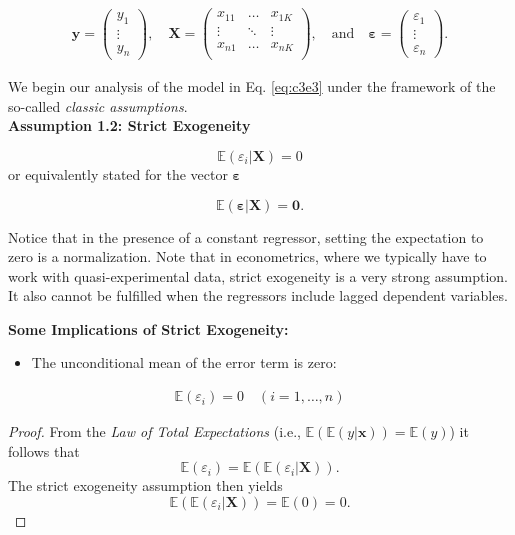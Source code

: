 \documentclass[]{book}
\providecommand{\tightlist}{%
  \setlength{\itemsep}{0pt}\setlength{\parskip}{0pt}}
\theoremstyle{definition}
\theoremstyle{definition}
\theoremstyle{definition}
\theoremstyle{remark}
\let\BeginKnitrBlock\begin \let\EndKnitrBlock\end
\begin{document}
\[
\begin{align*}
\mathbf{y} = \left(\begin{matrix}y_1\\ \vdots\\y_n\end{matrix}\right),\quad
\mathbf{X} = \left( \begin{matrix}
x_{11} & \dots & x_{1K} \\ \vdots & \ddots & \vdots \\ x_{n1} &\dots&x_{nK}\\
\end{matrix}\right),\quad\text{and}\quad \boldsymbol{\varepsilon}=\left(\begin{matrix}\varepsilon_1\\ \vdots\\ \varepsilon_n\end{matrix}\right).
\end{align*}
\]

We begin our analysis of the model in Eq. \eqref{eq:c3e3} under the
framework of the so-called \emph{classic assumptions}.\\
\textbf{Assumption 1.2: Strict Exogeneity}

\[\mathbb{E}(\varepsilon_i|\mathbf{X}) = 0\]
or equivalently stated for the vector \(\boldsymbol{\varepsilon}\)

\[\mathbb{E}(\boldsymbol{\varepsilon}|\mathbf{X}) = \mathbf{0}.\]

Notice that in the presence of a constant regressor, setting the expectation to zero is a normalization. Note that in econometrics, where we typically have to work with quasi-experimental data, strict exogeneity is a very strong assumption. It also cannot be
fulfilled when the regressors include lagged dependent variables.

\textbf{Some Implications of Strict Exogeneity:}

\begin{itemize}
\tightlist
\item
  The unconditional mean of the error term is zero:
\end{itemize}

\[
\begin{align*} 
\mathbb{E}(\varepsilon_i) = 0\quad(i=1,\dots,n)
\label{eq:c3e4}
\end{align*}
\]

\BeginKnitrBlock{proof}
{} From the \emph{Law of Total Expectations} (i.e.,
\(\mathbb{E}(\mathbb{E}(y|\mathbf{x}))=\mathbb{E}(y)\)) it follows that
\[\mathbb{E}(\varepsilon_i)=\mathbb{E}(\mathbb{E}(\varepsilon_i|\mathbf{X})).\] The strict exogeneity assumption
then yields \[\mathbb{E}(\mathbb{E}(\varepsilon_i|\mathbf{X}))=\mathbb{E}(0)=0.\]
\EndKnitrBlock{proof}
\end{document}

